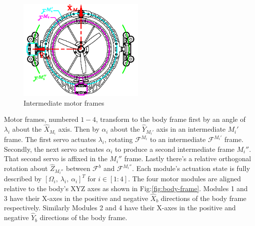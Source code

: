 \begin{minipage}{\textwidth}
\begin{figure}
\centering
\includegraphics[width=0.55\textwidth]{figs/motor-frame}
\caption{Intermediate motor frames}
\label{fig:motor-frame}
\end{figure}
\par
Motor frames, numbered $1-4$, transform to the body frame first by an angle of $\lambda_i$ about the $\hat{X}_{M_i}$ axis. Then by $\alpha_i$ about the $\hat{Y}_{M_i'}$ axis in an intermediate $M_i'$ frame. The first servo actuates $\lambda_i$, rotating $\mathcal{F}^{M_i}$ to an intermediate $\mathcal{F}^{M_i'}$ frame. Secondly, the next servo actuates $\alpha_i$ to produce a second intermediate frame $M_i''$. That second servo is affixed in the $M_i''$ frame. Lastly there's a relative orthogonal rotation about $\hat{Z}_{M_i''}$ between $\mathcal{F}^b$ and $\mathcal{F}^{M_i''}$. Each module's actuation state is fully described by $[\Omega_{i},~\lambda_{i},~\alpha_{i}]^{T}$ for $i\in [1:4]$. The four motor modules are aligned relative to the body's XYZ axes as shown in Fig:\ref{fig:body-frame}. Modules 1 and 3 have their X-axes in the positive and negative $\hat{X}_b$ directions of the body frame respectively. Similarly Modules 2 and 4 have their X-axes in the positive and negative $\hat{Y}_b$ directions of the body frame.
\end{minipage}
\newpage
